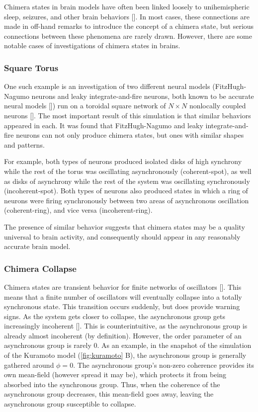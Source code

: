 Chimera states in brain models have often been linked loosely to
unihemispheric sleep,
seizures,
and other brain behaviors [].
In most cases,
these connections are made in off-hand remarks to introduce the concept of a chimera state,
but serious connections between these phenomena are rarely drawn.
However,
there are some notable cases of investigations of chimera states in brains.

\subsubsection{Square Torus}
\label{sec:lit_review_chimera_square_torus}
One such example is an investigation of two different neural models
(FitzHugh-Nagumo neurons and leaky integrate-and-fire neurons, both known to be accurate neural models [])
run on a toroidal square network of $N \times N$ nonlocally coupled neurons [].
The most important result of this simulation is that similar behaviors appeared in each.
It was found that FitzHugh-Nagumo and leaky integrate-and-fire neurons can not only produce chimera states,
but ones with similar shapes and patterns.

For example,
both types of neurons produced isolated disks of high synchrony while the rest of the torus was oscillating asynchronously (coherent-spot),
as well as disks of asynchrony while the rest of the system was oscillating synchronously (incoherent-spot).
Both types of neurons also produced states in which a ring of neurons were firing synchronously
between two areas of asynchronous oscillation (coherent-ring),
and vice versa (incoherent-ring).

The presence of similar behavior suggests that chimera states may be a quality universal to brain activity,
and consequently should appear in any reasonably accurate brain model.

\subsubsection{Chimera Collapse}
\label{sec:lit_review_chimera_collapse}
Chimera states are transient behavior for finite networks of oscillators [].
This means that a finite number of oscillators will eventually collapse into a totally synchronous state.
This transition occurs suddenly, but does provide warning signs.
As the system gets closer to collapse, the asynchronous group gets increasingly incoherent [].
This is counterintuitive, as the asynchronous group is already almost incoherent (by definition).
However, the order parameter of an asynchronous group is rarely 0.
As an example, in the snapshot of the simulation of the Kuramoto model (\cref{fig:kuramoto} B), the asynchronous group is generally gathered around $\phi = 0$.
The asynchronous group's non-zero coherence provides its own mean-field (however spread it may be), which protects it from being absorbed into the synchronous group.
Thus, when the coherence of the asynchronous group decreases, this mean-field goes away, leaving the asynchronous group susceptible to collapse.

